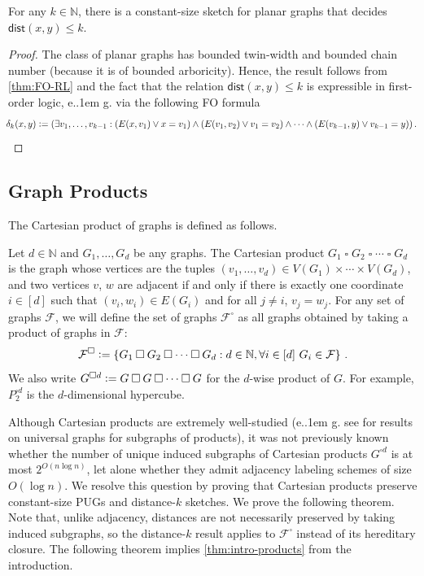 \documentclass{theoretics}
\makeatletter
\newcommand{\dist}{\mathsf{dist}}
\newcommand{\define}{\vcentcolon=}
\newcommand{\cF}{\ensuremath{\mathcal{F}}}
\newcommand{\bN}{\ensuremath{\mathbb{N}}}
\newcommand*\eg{e.\kern.1em g.\@\xspace} %
\makeatother
\begin{document}
\begin{corollary}
For any $k \in \bN$, there is a constant-size sketch for planar graphs that decides $\dist(x,y)
\leq k$.
\end{corollary}
\begin{proof}
	The class of planar graphs has bounded twin-width \cite{BKTW20} and bounded chain number (because it is of bounded arboricity). Hence, the result follows from \cref{thm:FO-RL} and the fact that 
	the relation $\dist(x,y) \leq k$ is expressible in first-order logic, \eg via the following FO formula
	\[
	\!\!\delta_k(x,y) \define (\exists v_1, \dotsc, v_{k-1} : (E(x,v_1) \vee x=v_1) \wedge
	(E(v_1,v_2) \vee v_1=v_2) \wedge
	\dotsm \wedge (E(v_{k-1},y) \vee v_{k-1}=y)) \,.
	\]
\end{proof}

\subsection{Graph Products}
\label{section:cartesian product}

The Cartesian product of graphs is defined as follows.

\begin{definition}
Let $d \in \bN$ and $G_1,\ldots,G_d$ be any graphs.  The Cartesian product $G_1 \mathbin\square G_2
\mathbin\square \cdots \mathbin\square G_d$ is the graph whose vertices are the tuples $(v_1,
\dotsc, v_d) \in V(G_1)\times\cdots\times V(G_d)$, and two vertices $v$, $w$ are adjacent if and
only if there is exactly one coordinate $i \in [d]$ such that $(v_i,w_i) \in E(G_i)$ and for all $j
\neq i$, $v_j=w_j$.  For any set of graphs $\cF$, we will define the set of graphs $\cF^\square$ as
all graphs obtained by taking a product of graphs in $\cF$:
\[
  \cF^\square \define \left\{ G_1 \mathbin\square G_2 \mathbin\square \dotsm \mathbin\square G_d : d \in \bN,
\forall i \in [d]\,\, G_i \in \cF \right\} \,.
\]
We also write $G^{\square d} \define G \mathbin\square G \mathbin\square \dotsm \mathbin\square G$ for the $d$-wise product
of $G$.  For example, $P_2^{\square d}$ is the $d$-dimensional hypercube.
\end{definition}
Although Cartesian products are extremely well-studied (\eg see \cite{CLR20} for results on
universal graphs for subgraphs of products), it was not previously known whether the number of
unique induced subgraphs of Cartesian products $G^{\square d}$ is at most $2^{O(n \log n)}$, let
alone whether they admit adjacency labeling schemes of size $O(\log n)$. We resolve this question by
proving that Cartesian products preserve constant-size PUGs and distance-$k$ sketches.  We prove the
following theorem. Note that, unlike adjacency, distances are not necessarily preserved by taking
induced subgraphs, so the distance-$k$ result applies to $\cF^\square$ instead of its hereditary
closure. The following theorem implies \cref{thm:intro-products} from the introduction.
\end{document}
